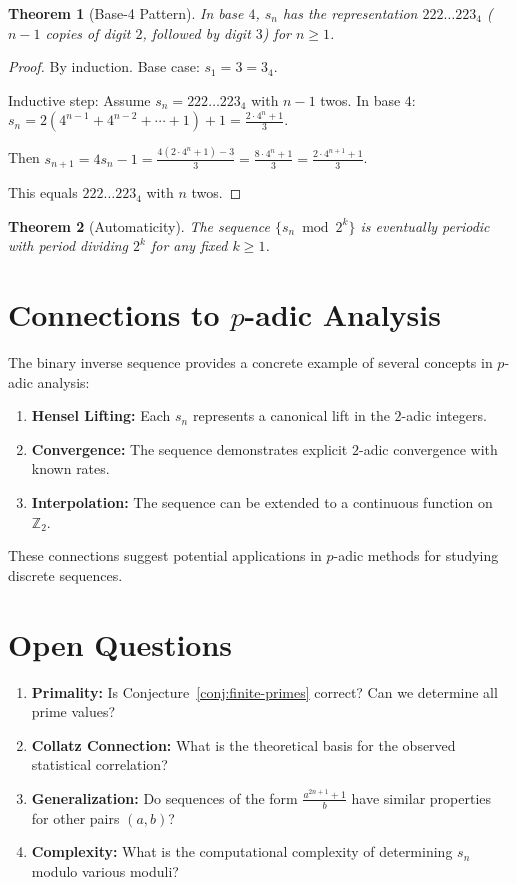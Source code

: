 \documentclass[11pt]{article}
\newtheorem{theorem}{Theorem}[section]
\theoremstyle{definition}
\newcommand{\Z}{\mathbb{Z}}
\begin{document}
\begin{theorem}[Base-4 Pattern]\label{thm:base4}
In base $4$, $s_n$ has the representation $222\ldots223_4$ ($n-1$ copies of digit $2$, followed by digit $3$) for $n \geq 1$.
\end{theorem}

\begin{proof}
By induction. Base case: $s_1 = 3 = 3_4$.

Inductive step: Assume $s_n = 222\ldots223_4$ with $n-1$ twos.
In base $4$: $s_n = 2(4^{n-1} + 4^{n-2} + \cdots + 1) + 1 = \frac{2 \cdot 4^n + 1}{3}$.

Then $s_{n+1} = 4s_n - 1 = \frac{4(2 \cdot 4^n + 1) - 3}{3} = \frac{8 \cdot 4^n + 1}{3} = \frac{2 \cdot 4^{n+1} + 1}{3}$.

This equals $222\ldots223_4$ with $n$ twos.
\end{proof}

\begin{theorem}[Automaticity]\label{thm:automatic}
The sequence $\{s_n \bmod 2^k\}$ is eventually periodic with period dividing $2^k$ for any fixed $k \geq 1$.
\end{theorem}


\section{Connections to $p$-adic Analysis}

The binary inverse sequence provides a concrete example of several concepts in $p$-adic analysis:
\begin{enumerate}
\item \textbf{Hensel Lifting:} Each $s_n$ represents a canonical lift in the $2$-adic integers.
\item \textbf{Convergence:} The sequence demonstrates explicit $2$-adic convergence with known rates.
\item \textbf{Interpolation:} The sequence can be extended to a continuous function on $\Z_2$.
\end{enumerate}

These connections suggest potential applications in $p$-adic methods for studying discrete sequences.

\section{Open Questions}

\begin{enumerate}
\item \textbf{Primality:} Is Conjecture~\ref{conj:finite-primes} correct? Can we determine all prime values?
\item \textbf{Collatz Connection:} What is the theoretical basis for the observed statistical correlation?
\item \textbf{Generalization:} Do sequences of the form $\frac{a^{2n+1} + 1}{b}$ have similar properties for other pairs $(a,b)$?
\item \textbf{Complexity:} What is the computational complexity of determining $s_n$ modulo various moduli?
\end{enumerate}
\end{document}
